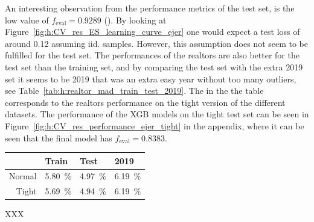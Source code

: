 An interesting observation from the performance metrics of the test set, is the low value of $f_\mathrm{eval}=0.9289$ (). By looking at Figure~\ref{fig:h:CV_res_ES_learning_curve_ejer} one would expect a test loss of around \num{0.12} assuming iid. samples. However, this assumption does not seem to be fulfilled for the test set. The performances of the realtors are also better for the test set than the training set, and by comparing the test set with the extra 2019 set it seems to be 2019 that was an extra easy year without too many outliers, see Table~\ref{tab:h:realtor_mad_train_test_2019}. The  in the the table corresponds to the realtors performance on the tight version of the different datasets. The performance of the XGB models on the tight test set can be seen in Figure~\ref{fig:h:CV_res_performance_ejer_tight} in the appendix, where it can be seen that the final model has $f_\mathrm{eval}=0.8383$. 
\begin{margintable}
  \centerfloat
  \begin{tabular}{@{}rlll@{}}
          & Train               & Test                & \num{2019}          \\ \midrule
  Normal  & \SI{5.80}{\percent} & \SI{4.97}{\percent} & \SI{6.19}{\percent} \\
  Tight   & \SI{5.69}{\percent} & \SI{4.94}{\percent} & \SI{6.19}{\percent} 
  \end{tabular}
  \vspace{\abovecaptionskip}
  \caption{XXX}
  \label{tab:h:realtor_mad_train_test_2019}
\end{margintable}

